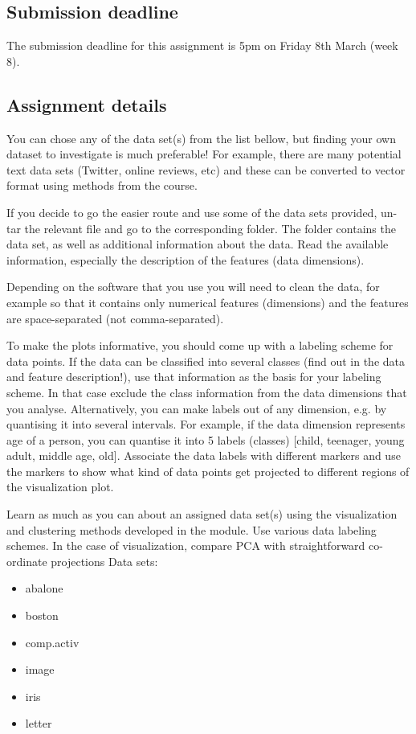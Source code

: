 \documentclass[preprint,12pt]{elsarticle}
\begin{document}
\subsection{Submission deadline}
\label{ss:deadline}
The submission deadline for this assignment is 5pm on Friday 8th March (week 8).
%
\subsection{Assignment details}
\label{ss:details}
You can chose any of the data set(s) from the list bellow, but finding your own dataset to investigate is much preferable!  For example, there are many potential text data sets (Twitter, online reviews, etc) and these can be converted to vector format using methods from the course.

If you decide to go the easier route and use some of the data sets provided, un-tar the relevant file and go to the corresponding folder.  The folder contains the data set, as well as additional information about the data. Read the available information, especially the description of the features (data dimensions).

Depending on the software that you use you will need to clean the data, for example so that it contains only numerical features (dimensions) and the features are space-separated (not comma-separated).

To make the plots informative, you should come up with a labeling scheme for data points.
If the data can be classified into several classes (find out in the data and feature description!), use that information as the basis for your labeling scheme. In that case exclude the class information from the data dimensions that you analyse.  Alternatively, you can make labels out of any dimension, e.g. by quantising it into several intervals. For example, if the data dimension represents age of a person, you can quantise it into 5 labels (classes) [child, teenager, young adult, middle age, old].  Associate the data labels with different markers and use the markers to show what kind of data points get projected to different regions of the visualization plot.

Learn as much as you can about an assigned data set(s) using the visualization and clustering methods developed in the module.
Use various data labeling schemes.
In the case of visualization, compare PCA with straightforward co-ordinate projections
Data sets:

\begin{itemize}
    \item abalone
    \item boston
    \item comp.activ
    \item image
    \item iris
    \item letter
\end{itemize}
\end{document}
